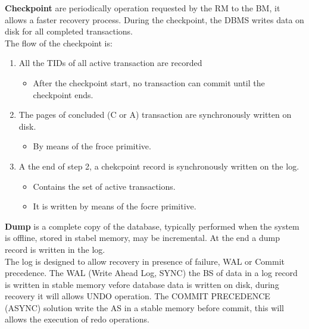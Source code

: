 \documentclass[12pt]{article}
\begin{document}
\textbf{Checkpoint} are periodically operation requested by the RM to the BM, it allows a faster recovery process. During the checkpoint, the DBMS writes data on disk for all completed transactions.\\
The flow of the checkpoint is:
\begin{enumerate}
  \item All the TIDs of all active transaction are recorded
  \begin{itemize}
    \item After the checkpoint start, no transaction can commit until the checkpoint ends.
  \end{itemize}
  \item The pages of concluded (C or A) transaction are synchronously written on disk.
  \begin{itemize}
    \item By means of the froce primitive.
  \end{itemize}
  \item A the end of step 2, a chekcpoint record is synchronously written on the log.
  \begin{itemize}
    \item Contains the set of active transactions.
    \item It is written by means of the focre primitive.
  \end{itemize}
\end{enumerate}

\textbf{Dump} is a complete copy of the database, typically performed when the system is offline, stored in stabel memory, may be incremental. At the end a dump record is written in the log.\\

The log is designed to allow recovery in presence of failure, WAL or Commit precedence. The WAL (Write Ahead Log, SYNC) the BS of data in a log record is written in stable memory vefore database data is written on disk, during recovery it will allows UNDO operation. The COMMIT PRECEDENCE (ASYNC) solution write the AS in a stable memory before commit, this will allows the execution of redo operations.\\
\end{document}
